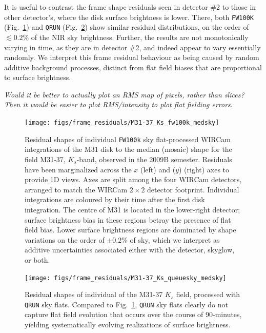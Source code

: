 \documentclass[iop]{emulateapj}
\newcommand{\mycomment}[1]{\textcolor{OliveGreen}{\textit{#1}}} %
\newcommand{\Fig}[1]{Fig.~\ref{fig:#1}}  %
\begin{document}
It is useful to contrast the frame shape residuals seen in detector \#2 to those in other detector's, where the disk surface brightness is lower.
There, both \texttt{FW100K} (\Fig{frame_residuals_M31-37_Ks_fw100k_medsky}) and \texttt{QRUN} (\Fig{frame_residuals_M31-37_Ks_QRUN}) show similar residual distributions, on the order of $\lesssim 0.2$\% of the NIR sky brightness.
Further, the results are not monotonically varying in time, as they are in detector \#2, and indeed appear to vary essentially randomly.
We interpret this frame residual behaviour as being caused by random additive background processes, distinct from flat field biases that are proportional to surface brightness.

\mycomment{Would it be better to actually plot an RMS map of pixels, rather than slices? Then it would be easier to plot RMS/intensity to plot flat fielding errors}.

\begin{figure}[p]
\centering
\texttt{[image: figs/frame\_residuals/M31-37\_Ks\_fw100k\_medsky]}
\caption{Residual shapes of individual \texttt{FW100k} sky flat-processed WIRCam integrations of the M31 disk to the median (mosaic) shape for the field M31-37, $K_s$-band, observed in the 2009B semester.
Residuals have been marginalized across the $x$ (left) and ($y$) (right) axes to provide 1D views.
Axes are split among the four WIRCam detectors, arranged to match the WIRCam $2\times2$ detector footprint.
Individual integrations are coloured by their time after the first disk integration.
The centre of M31 is located in the lower-right detector; surface brightness bias in these regions betray the presence of flat field bias. Lower surface brightness regions are dominated by shape variations on the order of $\pm 0.2\%$ of sky, which we interpret as additive uncertainties associated either with the detector, skyglow, or both.}
\label{fig:frame_residuals_M31-37_Ks_fw100k_medsky}
\end{figure}


\begin{figure}[p]
\centering
\texttt{[image: figs/frame\_residuals/M31-37\_Ks\_queuesky\_medsky]}
\caption{Residual shapes of individual of the M31-37 $K_s$ field, processed with \texttt{QRUN} sky flats. Compared to \Fig{frame_residuals_M31-37_Ks_fw100k_medsky}, \texttt{QRUN} sky flats clearly do not capture flat field evolution that occurs over the course of 90-minutes, yielding systematically evolving realizations of surface brightness.}
\label{fig:frame_residuals_M31-37_Ks_QRUN}
\end{figure}
\end{document}

